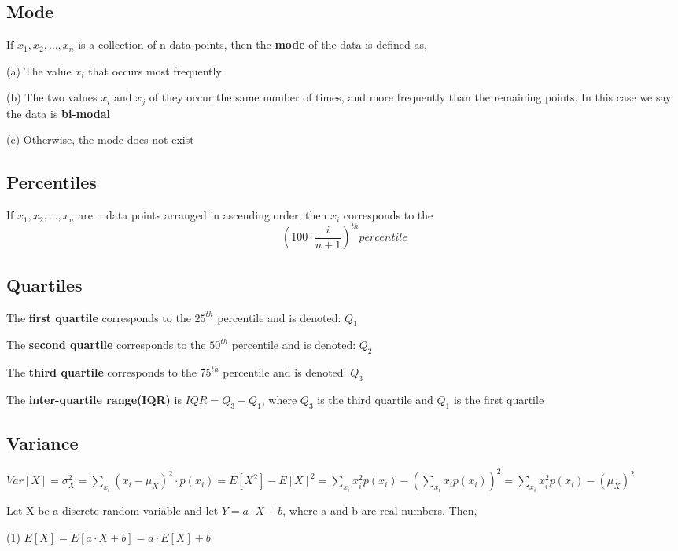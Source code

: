 \documentclass[12pt]{article}
\begin{document}
\begin{spacing}{2.0}
\subsection{Mode}

If $x_1,x_2, \ldots, x_n$ is a collection of n data points, then the \textbf{mode} of the data is defined as,

(a) The value $x_i$ that occurs most frequently

(b) The two values $x_i$ and $x_j$ of they occur the same number of times, and more frequently than the remaining points. In this case we say the data is \textbf{bi-modal}

(c) Otherwise, the mode does not exist

\subsection{Percentiles}

If $x_1,x_2, \ldots, x_n$ are n data points arranged in ascending order, then $x_i$ corresponds to the $$\left( 100\cdot \frac{i}{n+1} \right)^{th} percentile$$

\subsection{Quartiles}

The \textbf{first quartile} corresponds to the $25^{th}$ percentile and is denoted: $Q_1$

The \textbf{second quartile} corresponds to the $50^{th}$ percentile and is denoted: $Q_2$

The \textbf{third quartile} corresponds to the $75^{th}$ percentile and is denoted: $Q_3$

The \textbf{inter-quartile range(IQR)} is $IQR=Q_3- Q_1$, where $Q_3$ is the third quartile and $Q_1$ is the first quartile

\subsection{Variance}

$Var[X]= \sigma_X^2 = \sum\limits_{x_i} (x_i- \mu_X)^2 \cdot p(x_i)= E[X^2]- E[X]^2= \sum\limits_{x_i} x_i^2p(x_i)- \left( \sum\limits_{x_i} x_i p(x_i) \right)^2= \sum\limits_{x_i} x_i^2p(x_i) - \left( \mu_X \right)^2$

Let X be a discrete random variable and let $Y=a\cdot X+b$, where a and b are real numbers. Then,

(1) $E[X]= E[a\cdot X+b] = a\cdot E[X] +b$


\end{spacing}
\end{document}
